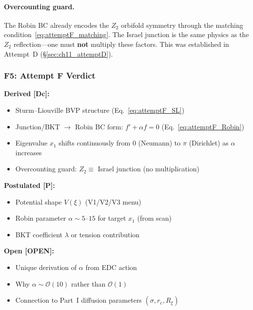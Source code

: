 \paragraph{Overcounting guard.}
The Robin BC already encodes the $Z_2$ orbifold symmetry through the matching
condition~\eqref{eq:attemptF_matching}. The Israel junction is the same physics
as the $Z_2$ reflection---one must \textbf{not} multiply these factors. This was
established in Attempt~D (\S\ref{sec:ch11_attemptD}).

\subsubsection{F5: Attempt F Verdict}
\label{sec:attemptF_verdict}

\begin{tcolorbox}[colback=blue!5!white, colframe=blue!50!black,
    title=\textbf{Attempt F: What Became [Dc], [P], [OPEN]}]

\textbf{Derived [Dc]:}
\begin{itemize}[nosep]
    \item Sturm--Liouville BVP structure (Eq.~\ref{eq:attemptF_SL})
    \item Junction/BKT $\to$ Robin BC form: $f' + \alpha f = 0$ (Eq.~\ref{eq:attemptF_Robin})
    \item Eigenvalue $x_1$ shifts continuously from 0 (Neumann) to $\pi$ (Dirichlet)
          as $\alpha$ increases
    \item Overcounting guard: $Z_2 \equiv$ Israel junction (no multiplication)
\end{itemize}

\textbf{Postulated [P]:}
\begin{itemize}[nosep]
    \item Potential shape $V(\xi)$ (V1/V2/V3 menu)
    \item Robin parameter $\alpha \sim 5$--$15$ for target $x_1$ (from scan)
    \item BKT coefficient $\lambda$ or tension contribution
\end{itemize}

\textbf{Open [OPEN]:}
\begin{itemize}[nosep]
    \item Unique derivation of $\alpha$ from EDC action
    \item Why $\alpha \sim \mathcal{O}(10)$ rather than $\mathcal{O}(1)$
    \item Connection to Part~I diffusion parameters $(\sigma, r_e, R_\xi)$
\end{itemize}
\end{tcolorbox}


